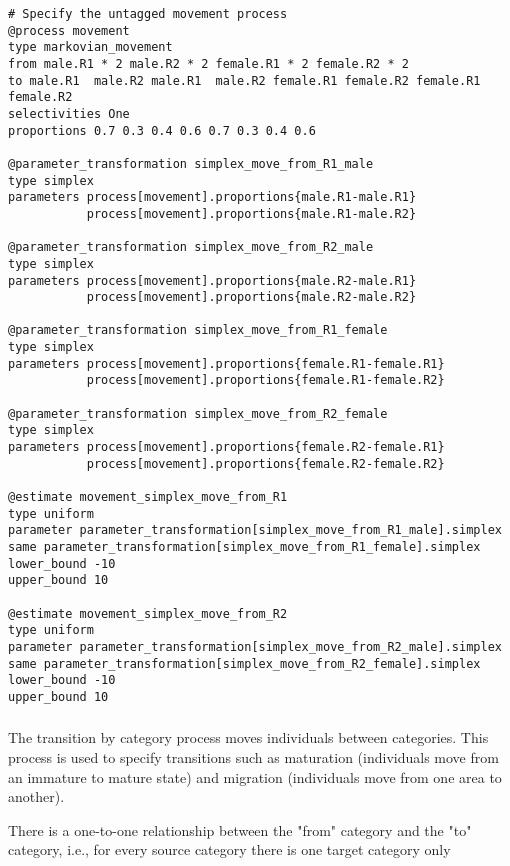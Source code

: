 {\small{\begin{verbatim}
# Specify the untagged movement process
@process movement
type markovian_movement
from male.R1 * 2 male.R2 * 2 female.R1 * 2 female.R2 * 2
to male.R1  male.R2 male.R1  male.R2 female.R1 female.R2 female.R1  female.R2
selectivities One
proportions 0.7 0.3 0.4 0.6 0.7 0.3 0.4 0.6

@parameter_transformation simplex_move_from_R1_male
type simplex
parameters process[movement].proportions{male.R1-male.R1}
           process[movement].proportions{male.R1-male.R2}

@parameter_transformation simplex_move_from_R2_male
type simplex
parameters process[movement].proportions{male.R2-male.R1}
           process[movement].proportions{male.R2-male.R2}
			
@parameter_transformation simplex_move_from_R1_female
type simplex
parameters process[movement].proportions{female.R1-female.R1} 
           process[movement].proportions{female.R1-female.R2}

@parameter_transformation simplex_move_from_R2_female
type simplex
parameters process[movement].proportions{female.R2-female.R1} 
           process[movement].proportions{female.R2-female.R2}

@estimate movement_simplex_move_from_R1
type uniform
parameter parameter_transformation[simplex_move_from_R1_male].simplex
same parameter_transformation[simplex_move_from_R1_female].simplex
lower_bound -10
upper_bound 10

@estimate movement_simplex_move_from_R2
type uniform
parameter parameter_transformation[simplex_move_from_R2_male].simplex
same parameter_transformation[simplex_move_from_R2_female].simplex
lower_bound -10
upper_bound 10
\end{verbatim}}}

\subsubsection{}\label{sec:Process-TransitionCategory}\label{sec:Process-Maturation}

The transition by category process moves individuals between categories. This process is used to specify transitions such as maturation (individuals move from an immature to mature state) and migration (individuals move from one area to another).

There is a one-to-one relationship between the "from" category and the "to" category, i.e., for every source category there is one target category only

